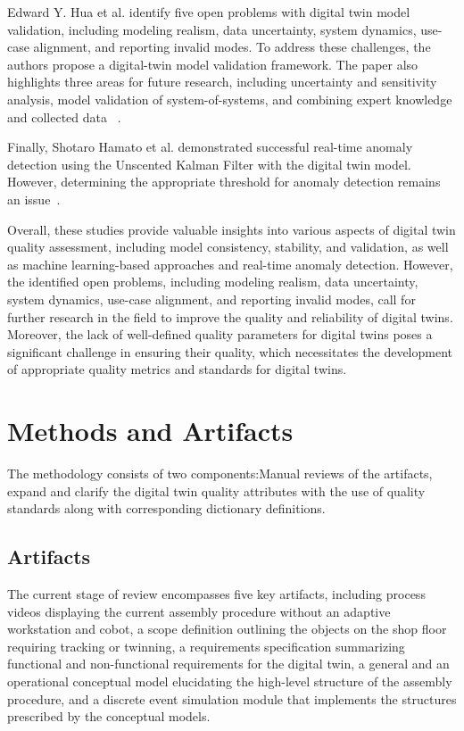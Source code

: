 \documentclass{llncs}
\begin{document}
    Edward Y. Hua et al. identify five open problems with digital twin model validation, including modeling realism, data uncertainty, system dynamics, use-case alignment, and reporting invalid modes. To address these challenges, the authors propose a digital-twin model validation framework. The paper also highlights three areas for future research, 
    including uncertainty and sensitivity analysis, model validation of system-of-systems, and combining expert knowledge and collected data ~\cite{ValidationofDigitalTwins}. 

    Finally, Shotaro Hamato et al.  demonstrated successful real-time anomaly detection using the Unscented Kalman Filter with the digital twin model. 
    However, determining the appropriate threshold for anomaly detection remains an issue~\cite{JapeneseKalmanFilterCorrectness}.

    Overall, these studies provide valuable insights into various aspects of digital twin quality assessment, 
    including model consistency, stability, and validation, as well as machine learning-based approaches and real-time anomaly detection. 
    However, the identified open problems, including modeling realism, data uncertainty, system dynamics, use-case alignment, and reporting invalid modes, 
    call for further research in the field to improve the quality and reliability of digital twins. Moreover, 
    the lack of well-defined quality parameters for digital twins poses a significant challenge in ensuring their quality,
    which necessitates the development of appropriate quality metrics and standards for digital twins.

    \section{Methods and Artifacts}
    The methodology consists of two components:Manual reviews of the artifacts, expand and clarify the digital twin quality attributes with the use of quality standards along with corresponding dictionary definitions.
    
    \subsection{Artifacts}
    The current stage of review encompasses five key artifacts, including process videos displaying the current assembly procedure without an adaptive workstation and cobot, a scope definition outlining the objects on the shop floor requiring tracking or twinning, a requirements specification summarizing functional and non-functional requirements for the digital twin, a general and an operational conceptual model elucidating the high-level structure of the assembly procedure, 
    and a discrete event simulation module that implements the structures prescribed by the conceptual models.
\end{document}
